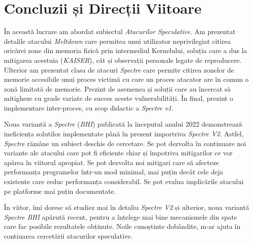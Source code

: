 \chapter{Concluzii și Direcții Viitoare}

În această lucrare am abordat subiectul \emph{Atacurilor Speculative}. Am
prezentat detalile atacului \emph{Meltdown} care permitea unui utilizator
neprivilegiat citirea oricărei zone din memoria fizică prin intermediul
Kernelului, soluția care a dus la mitigarea acestuia (\emph{KAISER}), cât
și observații personale legate de reproducere. Ulterior am prezentat clasa
de atacuri \emph{Spectre} care permite citirea zonelor de memorie 
accesibile unui proces victimă cu care un proces atacator are în comun
o zonă limitată de memorie. Prezint de asemenea și soluții care au încercat
să mitigheze cu grade variate de succes aceste vulnerabilități. În final,
prezint o implementare inter-proces, cu scop didactic a \emph{Spectre v1}.

Noua variantă a \emph{Spectre} (\emph{BHI}) publicată la începutul anului 2022
demonstrează ineficiența solutilor implementate până în prezent importriva
\emph{Spectre V2}. Astfel, \emph{Spectre} rămâne un subiect deschis de
cercetare. Se pot dezvolta în continuare noi variante ale atacului care pot fi
eficiente chiar și împotriva mitigarilor ce vor apărea în viitorul apropiat. Se
pot dezvolta noi mitigari care să afecteze performanța programelor într-un mod
minimal, mai puțin decât cele deja existente care reduc performanța
considerabil. Se pot evalua implicările atacului pe platforme mai puțin
documentate.

În viitor, îmi doresc să studiez mai în detaliu \emph{Spectre V2} și ulterior,
noua variantă \emph{Spectre BHI} apărută recent, pentru a înțelege mai bine
mecanismele din spate care fac posibile rezultatele obținute. Noile cunoștinte
dobândite, m-ar ajuta în contiuarea cercetării atacurilor speculative.
